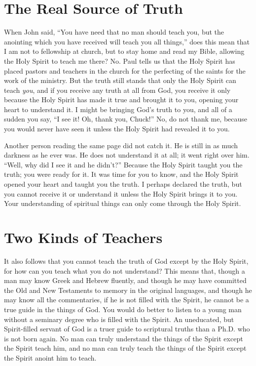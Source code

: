 \section*{The Real Source of Truth}

When John said, “You have need that no man should 
teach you, but the anointing which you have received will 
teach you all things,” does this mean that I am not to fellowship at church, but to stay home and read my Bible, 
allowing the Holy Spirit to teach me there? No. Paul tells us 
that the Holy Spirit has placed pastors and teachers in the
church for the perfecting of the saints for the work of the 
ministry. But the truth still stands that only the Holy Spirit 
can teach \emph{you}, and if you receive any truth at all from God, 
you receive it only because the Holy Spirit has made it true 
and brought it to you, opening your heart to understand it. 
I might be bringing God’s truth to you, and all of a sudden 
you say, “I see it! Oh, thank you, Chuck!” No, do not thank 
me, because you would never have seen it unless the Holy 
Spirit had revealed it to you.

Another person reading the same page did not catch it. 
He is still in as much darkness as he ever was. He does not 
understand it at all; it went right over him. “Well, why did 
I see it and he didn’t?” Because the Holy Spirit taught you 
the truth; you were ready for it. It was time for you to know, 
and the Holy Spirit opened your heart and taught you the 
truth. I perhaps declared the truth, but you cannot receive it 
or understand it unless the Holy Spirit brings it to you. Your 
understanding of spiritual things can only come through 
the Holy Spirit.


\section*{Two Kinds of Teachers}

It also follows that you cannot teach the truth of God 
except by the Holy Spirit, for how can you teach what you 
do not understand? This means that, though a man may 
know Greek and Hebrew fluently, and though he may have 
committed the Old and New Testaments to memory in the 
original languages, and though he may know all the commentaries, if he is not filled with the Spirit, he cannot be 
a true guide in the things of God. You would do better to 
listen to a young man without a seminary degree who is 
filled with the Spirit. An uneducated, but Spirit-filled servant of God is a truer guide to scriptural truths than a Ph.D. 
who is not born again. No man can truly understand the 
things of the Spirit except the Spirit teach him, and no man 
can truly teach the things of the Spirit except the Spirit 
anoint him to teach.

